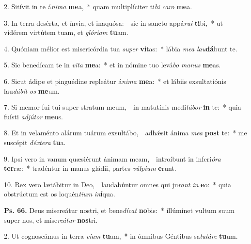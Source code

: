
2. Sitívit in te á\textit{ni}\textit{ma} \textbf{me}a,~* quam multiplíciter ti\textit{bi} \textit{ca}\textit{ro} \textbf{me}a.

3. In terra desérta, et ínvia, et inaquósa:~\GreDagger\ sic in sancto appá\textit{ru}\textit{i} \textbf{ti}bi,~* ut vidérem virtútem tuam, et \textit{gló}\textit{ri}\textit{am} \textbf{tu}am.

4. Quóniam mélior est misericórdia tua \textit{su}\textit{per} \textbf{vi}tas:~* lábia \textit{me}\textit{a} \textit{lau}\textbf{dá}bunt te.

5. Sic benedícam te in \textit{vi}\textit{ta} \textbf{me}a:~* et in nómine tuo levá\textit{bo} \textit{ma}\textit{nus} \textbf{me}as.

6. Sicut ádipe et pinguédine repleátur á\textit{ni}\textit{ma} \textbf{me}a:~* et lábiis exsultatiónis lau\textit{dá}\textit{bit} \textit{os} \textbf{me}um.

7. Si memor fui tui super stratum meum,~\GreDagger\ in matutínis medi\textit{tá}\textit{bor} \textbf{in} te:~* quia fuísti \textit{ad}\textit{jú}\textit{tor} \textbf{me}us.

8. Et in velaménto alárum tuárum exsultábo,~\GreDagger\ adh\'{\ae}sit ánima \textit{me}\textit{a} \textbf{post} te:~* me suscépit \textit{déx}\textit{te}\textit{ra} \textbf{tu}a.

9. Ipsi vero in vanum quæsiérunt ánimam meam,~\GreDagger\ introíbunt in inferi\textit{ó}\textit{ra} \textbf{ter}ræ:~* tradéntur in manus gládii, partes \textit{vúl}\textit{pi}\textit{um} \textbf{e}runt.

10. Rex vero lætábitur in Deo,~\GreDagger\ laudabúntur omnes qui ju\textit{rant} \textit{in} \textbf{e}o:~* quia obstrúctum est os loquén\textit{ti}\textit{um} \textit{in}\textbf{í}qua.

\textbf{Ps. 66.} Deus misereátur nostri, et bene\textit{dí}\textit{cat} \textbf{no}bis:~* illúminet vultum suum super nos, et mise\textit{re}\textit{á}\textit{tur} \textbf{nos}tri.

2. Ut cognoscámus in terra \textit{vi}\textit{am} \textbf{tu}am,~* in ómnibus Géntibus sa\textit{lu}\textit{tá}\textit{re} \textbf{tu}um.

